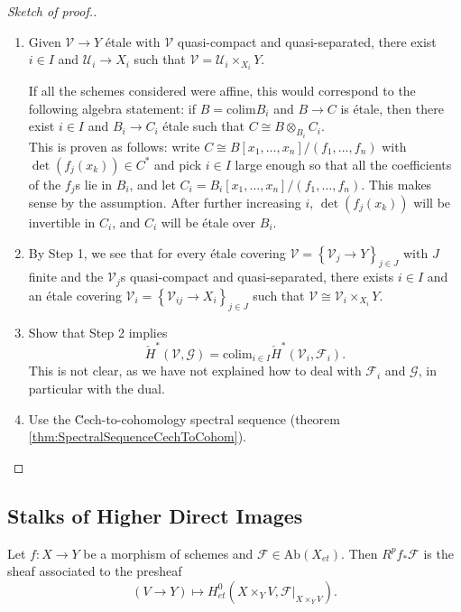 \begin{proof}[Sketch of proof.]$ $
\begin{enumerate}
\item 
Given $\mathcal{V}\to Y$ \'etale with $\mathcal{V}$ quasi-compact and quasi-separated, there exist $i\in I$ and $\mathcal{U}_i \to X_i$ such that $\mathcal{V} = \mathcal{U}_i \times_{X_i} Y$. 
\begin{remark}
If all the schemes considered were affine, this would correspond to the following algebra statement: if $B=\text{colim} B_i$ and $B\to C$ is \'etale, then there exist $i\in I$ and $B_i\to C_i$ \'etale such that $C \cong B \otimes_{B_i} C_i$. 
\\
This is proven as follows: write $C \cong B\left[x_1,\ldots, x_n\right]/(f_1, \ldots, f_n)$ with $\det (f_j(x_k)) \in C^*$ and pick $i\in I$ large enough so that all the coefficients of the $f_j$s lie in $B_i$, and let $C_i = B_i\left[x_1, \ldots, x_n\right]/(f_1, \dots, f_n)$. This makes sense by the assumption. After further increasing $i$, $\det (f_j(x_k))$ will be invertible in $C_i$, and $C_i$ will be \'etale over $B_i$. 
\end{remark}
\item 
By Step 1, we see that for every \'etale covering $\mathcal{V} = \left\{\mathcal{V}_j\to Y\right\}_{j\in J}$ with $J$ finite and the $\mathcal{V}_j$s quasi-compact and quasi-separated, there exists $i\in I$ and an \'etale covering $\mathcal{V}_i = \left\{\mathcal{V}_{ij} \to X_i \right\}_{j\in J}$ such that $\mathcal{V} \cong \mathcal{V}_i\times_{X_i} Y$. 
\item 
Show that Step 2 implies 
$$
\check H^*(\mathcal{V}, \mathcal{G})=\text{colim}_{i\in I}\check H^*(\mathcal{V}_i, \mathcal{F}_i).
$$ 
This is not clear, as we have not explained how to deal with $\mathcal{F}_i$ and $\mathcal{G}$, in particular with the dual.
\item 
Use the \u Cech-to-cohomology spectral sequence (theorem \ref{thm:SpectralSequenceCechToCohom}). 
\end{enumerate}
\end{proof}

\subsection{Stalks of Higher Direct Images}

\begin{lemma} \label{lem:higherDirectImagesPresheaf}
Let $f: X\to Y$ be a morphism of schemes and $\mathcal{F}\in \text{Ab}(X_{et})$. Then $R^pf_*\mathcal{F}$ is the sheaf associated to the presheaf
$$
(V\to Y)\longmapsto H_{et}^0 \left(X\times_Y V, \mathcal{F}|_{X\times_YV}\right).
$$
\end{lemma}

